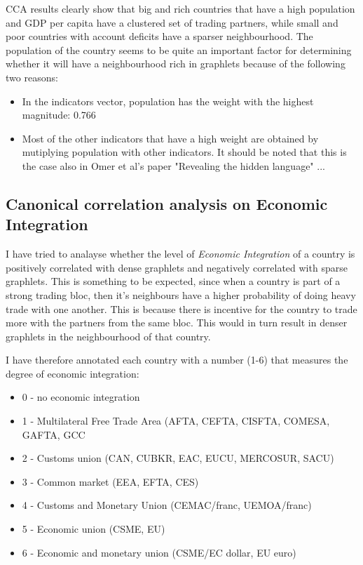 \documentclass[11pt,a4paper,oneside]{report}
\begin{document}
CCA results clearly show that big and rich countries that have a high population and GDP per capita have a clustered set of trading partners, while small and poor countries with account deficits have a sparser neighbourhood. The population of the country seems to be quite an important factor for determining whether it will have a neighbourhood rich in graphlets because of the following two reasons:
\begin{itemize}
 \item In the indicators vector, population has the weight with the highest magnitude: 0.766
 \item Most of the other indicators that have a high weight are obtained by mutiplying population with other indicators. It should be noted that this is the case also in Omer et al's paper "Revealing the hidden language" ...
\end{itemize}


\subsection*{Canonical correlation analysis on Economic Integration}

I have tried to analayse whether the level of \emph{Economic Integration} of a country is positively correlated with dense graphlets and negatively correlated with sparse graphlets. This is something to be expected, since when a country is part of a strong trading bloc, then it's neighbours have a higher probability of doing heavy trade with one another. This is because there is incentive for the country to trade more with the partners from the same bloc. This would in turn result in denser graphlets in the neighbourhood of that country. 

I have therefore annotated each country with a number (1-6) that measures the degree of economic integration:
\begin{itemize}
 \item 0 - no economic integration 
 \item 1 - Multilateral Free Trade Area (AFTA, CEFTA, CISFTA, COMESA, GAFTA, GCC
 \item 2 - Customs union (CAN, CUBKR, EAC, EUCU, MERCOSUR, SACU)
 \item 3 - Common market (EEA, EFTA, CES) 
 \item 4 - Customs and Monetary Union (CEMAC/franc, UEMOA/franc) 
 \item 5 - Economic union (CSME, EU) 
 \item 6 - Economic and monetary union (CSME/EC dollar, EU euro)
\end{itemize}
\end{document}
